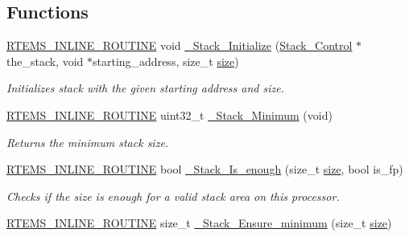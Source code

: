 \subsection*{Functions}
\begin{DoxyCompactItemize}
\item 
\mbox{\hyperlink{group__RTEMSScoreBaseDefs_gac216239df231d5dbd15e3520b0b9313f}{R\+T\+E\+M\+S\+\_\+\+I\+N\+L\+I\+N\+E\+\_\+\+R\+O\+U\+T\+I\+NE}} void \mbox{\hyperlink{group__RTEMSScoreStack_gacac0f0f9105a47a592e8d215a29c58a4}{\+\_\+\+Stack\+\_\+\+Initialize}} (\mbox{\hyperlink{structStack__Control}{Stack\+\_\+\+Control}} $\ast$the\+\_\+stack, void $\ast$starting\+\_\+address, size\+\_\+t \mbox{\hyperlink{sun4u_2tte_8h_a245260f6f74972558f61b85227df5aae}{size}})
\begin{DoxyCompactList}\small\item\em Initializes stack with the given starting address and size. \end{DoxyCompactList}\item 
\mbox{\hyperlink{group__RTEMSScoreBaseDefs_gac216239df231d5dbd15e3520b0b9313f}{R\+T\+E\+M\+S\+\_\+\+I\+N\+L\+I\+N\+E\+\_\+\+R\+O\+U\+T\+I\+NE}} uint32\+\_\+t \mbox{\hyperlink{group__RTEMSScoreStack_ga3363a134ab99ea804a61cad0eb9c971b}{\+\_\+\+Stack\+\_\+\+Minimum}} (void)
\begin{DoxyCompactList}\small\item\em Returns the minimum stack size. \end{DoxyCompactList}\item 
\mbox{\hyperlink{group__RTEMSScoreBaseDefs_gac216239df231d5dbd15e3520b0b9313f}{R\+T\+E\+M\+S\+\_\+\+I\+N\+L\+I\+N\+E\+\_\+\+R\+O\+U\+T\+I\+NE}} bool \mbox{\hyperlink{group__RTEMSScoreStack_gaf7041341c804491731396adcbb0506cf}{\+\_\+\+Stack\+\_\+\+Is\+\_\+enough}} (size\+\_\+t \mbox{\hyperlink{sun4u_2tte_8h_a245260f6f74972558f61b85227df5aae}{size}}, bool is\+\_\+fp)
\begin{DoxyCompactList}\small\item\em Checks if the size is enough for a valid stack area on this processor. \end{DoxyCompactList}\item 
\mbox{\hyperlink{group__RTEMSScoreBaseDefs_gac216239df231d5dbd15e3520b0b9313f}{R\+T\+E\+M\+S\+\_\+\+I\+N\+L\+I\+N\+E\+\_\+\+R\+O\+U\+T\+I\+NE}} size\+\_\+t \mbox{\hyperlink{group__RTEMSScoreStack_gaa4d28f2b60601a0713925707f4379743}{\+\_\+\+Stack\+\_\+\+Ensure\+\_\+minimum}} (size\+\_\+t \mbox{\hyperlink{sun4u_2tte_8h_a245260f6f74972558f61b85227df5aae}{size}})

\end{DoxyCompactItemize}
